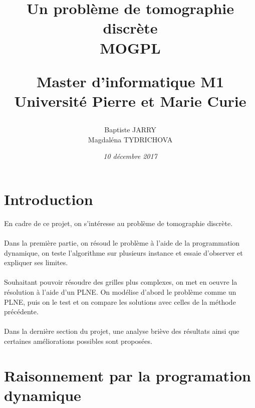 \documentclass[10pt,a4paper]{article}
\title{%
        \LARGE \textbf {Un problème de tomographie discrète}\\
        \vspace{8mm}
        \large \textbf{MOGPL}\\
        \vspace{10mm}
        \author{Baptiste JARRY \\ Magdaléna TYDRICHOVA}
        \large {Master d'informatique M1}\\
          \vspace{5mm}
        \large {Université Pierre et Marie Curie \vspace{15mm}}\\ 
        \date{\vspace{10mm} \textsf{\textrm{\textit{10 décembre 2017}}}}}
\begin{document}
\maketitle
\thispagestyle{empty}
\newpage
\section*{Introduction}
\addtocounter{page}{-1}
\noindent
En cadre de ce projet, on s'intéresse au problème de tomographie discrète. \\ \\
\noindent
Dans la première partie, on résoud le problème à l'aide de la programmation dynamique, on teste l'algorithme sur plusieurs instance et essaie d'observer et expliquer ses limites. \\ \\
\noindent
Souhaitant pouvoir résoudre des grilles plus complexes, on met en oeuvre la résolution à l'aide d'un PLNE. On modélise d'abord le problème comme un PLNE, puis on le test et on compare les solutions avec celles de la méthode précédente. \\ \\ 
\noindent
Dans la dernière section du projet, une analyse briève des résultats ainsi que certaines améliorations possibles sont proposées. 
\newpage
\section{Raisonnement par la programation dynamique}
\end{document}

